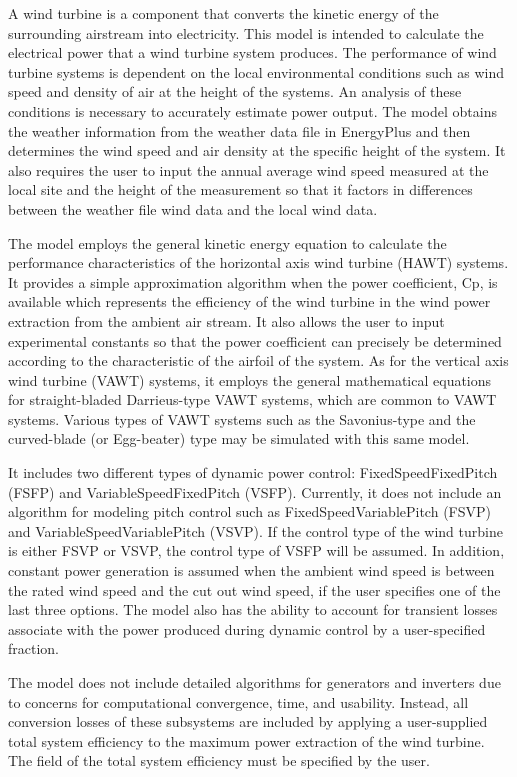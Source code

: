 A wind turbine is a component that converts the kinetic energy of the surrounding airstream into electricity. This model is intended to calculate the electrical power that a wind turbine system produces. The performance of wind turbine systems is dependent on the local environmental conditions such as wind speed and density of air at the height of the systems. An analysis of these conditions is necessary to accurately estimate power output. The model obtains the weather information from the weather data file in EnergyPlus and then determines the wind speed and air density at the specific height of the system. It also requires the user to input the annual average wind speed measured at the local site and the height of the measurement so that it factors in differences between the weather file wind data and the local wind data.

The model employs the general kinetic energy equation to calculate the performance characteristics of the horizontal axis wind turbine (HAWT) systems. It provides a simple approximation algorithm when the power coefficient, Cp, is available which represents the efficiency of the wind turbine in the wind power extraction from the ambient air stream. It also allows the user to input experimental constants so that the power coefficient can precisely be determined according to the characteristic of the airfoil of the system. As for the vertical axis wind turbine (VAWT) systems, it employs the general mathematical equations for straight-bladed Darrieus-type VAWT systems, which are common to VAWT systems. Various types of VAWT systems such as the Savonius-type and the curved-blade (or Egg-beater) type may be simulated with this same model.

It includes two different types of dynamic power control: FixedSpeedFixedPitch (FSFP) and VariableSpeedFixedPitch (VSFP). Currently, it does not include an algorithm for modeling pitch control such as FixedSpeedVariablePitch (FSVP) and VariableSpeedVariablePitch (VSVP). If the control type of the wind turbine is either FSVP or VSVP, the control type of VSFP will be assumed. In addition, constant power generation is assumed when the ambient wind speed is between the rated wind speed and the cut out wind speed, if the user specifies one of the last three options. The model also has the ability to account for transient losses associate with the power produced during dynamic control by a user-specified fraction.

The model does not include detailed algorithms for generators and inverters due to concerns for computational convergence, time, and usability. Instead, all conversion losses of these subsystems are included by applying a user-supplied total system efficiency to the maximum power extraction of the wind turbine. The field of the total system efficiency must be specified by the user.

